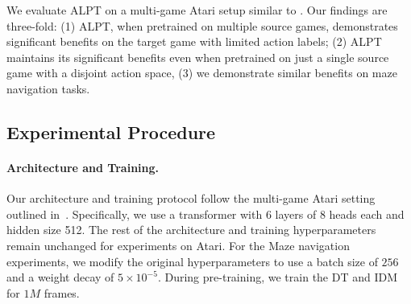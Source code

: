 \documentclass{article} %
\newcommand{\ofir}[1]{{\color{blue} Ofir: #1}}
\begin{document}
We evaluate ALPT on a multi-game Atari setup similar to \citet{https://doi.org/10.48550/arxiv.2205.15241}. Our findings are three-fold: (1) ALPT, when pretrained on multiple source games, demonstrates significant benefits on the target game with limited action labels; (2) ALPT maintains its significant benefits even when pretrained on just a single source game with a disjoint action space, (3) we demonstrate similar benefits on maze navigation tasks.

\subsection{Experimental Procedure}
\paragraph{Architecture and Training.} Our architecture and training protocol follow the multi-game Atari setting outlined in~\citet{https://doi.org/10.48550/arxiv.2205.15241}. Specifically, we use a transformer with 6 layers of 8 heads each and hidden size 512. The rest of the architecture and training hyperparameters remain unchanged for experiments on Atari. For the Maze navigation experiments, we modify the original hyperparameters to use a batch size of $256$ and a weight decay of $5 \times 10^{-5}$.  During pre-training, we train the DT and IDM for $1M$ frames.  %

\end{document}
